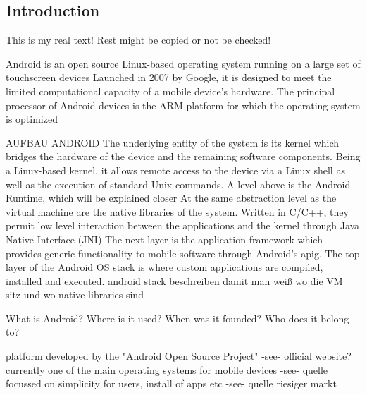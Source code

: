 \subsection{Introduction} \label{subsection:android-introduction}
This is my real text! Rest might be copied or not be checked!

%
Android is an open source Linux-based operating system running on a large set of touchscreen devices\newline
Launched in 2007 by Google, it is designed to meet the limited computational capacity of a mobile device’s hardware. The principal processor of Android devices is the ARM platform for which the operating system is optimized\newline

AUFBAU ANDROID
The underlying entity of the system is its kernel which bridges the hardware of the device and the remaining software components. Being a Linux-based kernel, it allows remote access to the device via a Linux shell as well as the execution of standard Unix commands.\newline
A level above is the Android Runtime, which will be explained closer\newline
At the same abstraction level as the virtual machine are the native libraries of the system. Written in C/C++, they permit low level interaction between the applications and the kernel through Java Native Interface (JNI)\newline
The next layer is the application framework which provides generic functionality to mobile software through Android’s  \gls{apig}.
The top layer of the Android OS stack is where custom applications are compiled, installed and executed.\newline
\cite{kovachevaMaster}
%
android stack beschreiben damit man weiß wo die VM sitz und wo native libraries sind


What is Android? Where is it used? When was it founded? Who does it belong to?\newline


platform developed by the "Android Open Source Project" -see- official website?\newline
currently one of the main operating systems for mobile devices -see- quelle\newline
focussed on simplicity for users, install of apps etc -see- quelle\newline
riesiger markt\newline
